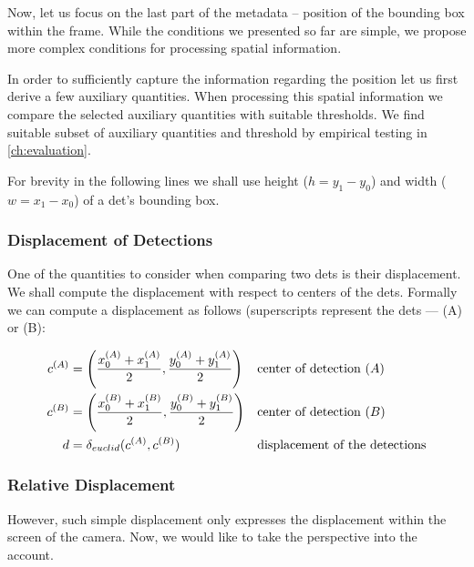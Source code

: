 \label{ssec:spatial_merging}

Now, let us focus on the last part of the metadata -- position of the bounding box within the frame. While the conditions we presented so far are simple, we propose more complex conditions for processing spatial information.

In order to sufficiently capture the information regarding the position let us first derive a few auxiliary quantities. When processing this spatial information we compare the selected auxiliary quantities with suitable thresholds. We find suitable subset of auxiliary quantities and threshold by empirical testing in \autoref{ch:evaluation}.

For brevity in the following lines we shall use height ($h = y_1 - y_0$) and
width ($w = x_1 - x_0$) of a \gls{det}'s bounding box.

\subsubsection{Displacement of Detections}

One of the quantities to consider when comparing two \glspl{det} is
their displacement. We shall compute the displacement with respect to centers
of the \glspl{det}. Formally we can compute a displacement as follows
(superscripts represent the \glspl{det} --- (A) or (B):

\begin{align*}
    c^{(A)} &= \left(\frac{x_0^{(A)} + x_1^{(A)}}{2}, \frac{y_0^{(A)} + y_1^{(A)}}{2}\right) &\vspace{1cm}&\text{center of detection }(A)\\
    c^{(B)} &= \left(\frac{x_0^{(B)} + x_1^{(B)}}{2}, \frac{y_0^{(B)} + y_1^{(B)}}{2}\right) &\vspace{1cm}&\text{center of detection }(B)\\
    d &= \delta_{euclid}(c^{(A)}, c^{(B)})&\vspace{1cm}&\text{displacement of the detections}
\end{align*}

\subsubsection{Relative Displacement}

However, such simple displacement only expresses the displacement within the screen of the camera. Now, we would like to take the perspective into the account.

